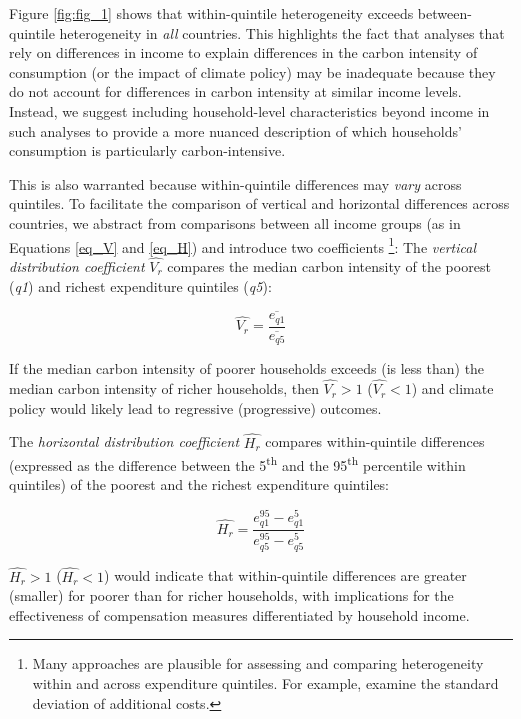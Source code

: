 \documentclass[12pt, a4paper]{article}
\begin{document}
Figure \ref{fig:fig_1} shows that within-quintile heterogeneity exceeds between-quintile heterogeneity in \textit{all} countries. This highlights the fact that analyses that rely on differences in income to explain differences in the carbon intensity of consumption (or the impact of climate policy) may be inadequate because they do not account for differences in carbon intensity at similar income levels. Instead, we suggest including household-level characteristics beyond income in such analyses to provide a more nuanced description of which households' consumption is particularly carbon-intensive.

This is also warranted because within-quintile differences may \textit{vary} across quintiles. To facilitate the comparison of vertical and horizontal differences across countries, we abstract from comparisons between all income groups (as in Equations \ref{eq_V} and \ref{eq_H}) and introduce two coefficients \autocite{Missbach.2024}\footnote{Many approaches are plausible for assessing and comparing heterogeneity within and across expenditure quintiles. For example, \textcite{Cronin.2019} examine the standard deviation of additional costs.}: The \textit{vertical distribution coefficient} $\widehat{V_{r}}$ compares the median carbon intensity of the poorest (\textit{q1}) and richest expenditure quintiles (\textit{q5}):

\begin{equation}
    \widehat{V_{r}} = \frac{\overline{e_{q1}}}{\overline{e_{q5}}}
\end{equation}

If the median carbon intensity of poorer households exceeds (is less than) the median carbon intensity of richer households, then $\widehat{V_{r}}>1$ ($\widehat{V_{r}}<1$) and climate policy would likely lead to regressive (progressive) outcomes.

The \textit{horizontal distribution coefficient} $\widehat{H_{r}}$ compares within-quintile differences (expressed as the difference between the 5\textsuperscript{th} and the 95\textsuperscript{th} percentile within quintiles) of the poorest and the richest expenditure quintiles:

\begin{equation}
    \widehat{H_{r}} = \frac{e_{q1}^{95} - e_{q1}^{5}}{e_{q5}^{95} - e_{q5}^{5}}
\end{equation}

$\widehat{H_{r}}>1$ ($\widehat{H_{r}}<1$) would indicate that within-quintile differences are greater (smaller) for poorer than for richer households, with implications for the effectiveness of compensation measures differentiated by household income.
\end{document}
